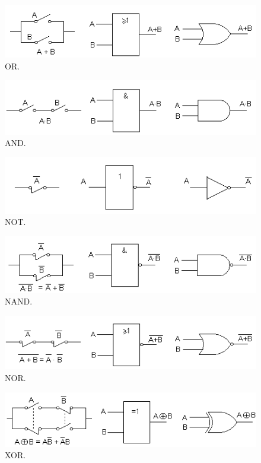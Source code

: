 \documentclass[a4paper, 11pt, titlepage]{article}
\begin{document}
    \begin{figure}[htp]
      \centering
      \includegraphics[width=1\textwidth]{resources/boole-or.png}
      \caption{OR.}
      \label{boole-or}
    \end{figure}

    \begin{figure}[htp]
      \centering
      \includegraphics[width=1\textwidth]{resources/boole-and.png}
      \caption{AND.}
      \label{boole-and}
    \end{figure}

    \begin{figure}[htp]
      \centering
      \includegraphics[width=1\textwidth]{resources/boole-not.png}
      \caption{NOT.}
      \label{boole-not}
    \end{figure}

    \begin{figure}[htp]
      \centering
      \includegraphics[width=1\textwidth]{resources/boole-nand.png}
      \caption{NAND.}
      \label{boole-nand}
    \end{figure}

    \begin{figure}[htp]
      \centering
      \includegraphics[width=1\textwidth]{resources/boole-nor.png}
      \caption{NOR.}
      \label{boole-nor}
    \end{figure}

    \begin{figure}[htp]
      \centering
      \includegraphics[width=1\textwidth]{resources/boole-xor.png}
      \caption{XOR.}
      \label{boole-xor}
    \end{figure}
\end{document}
